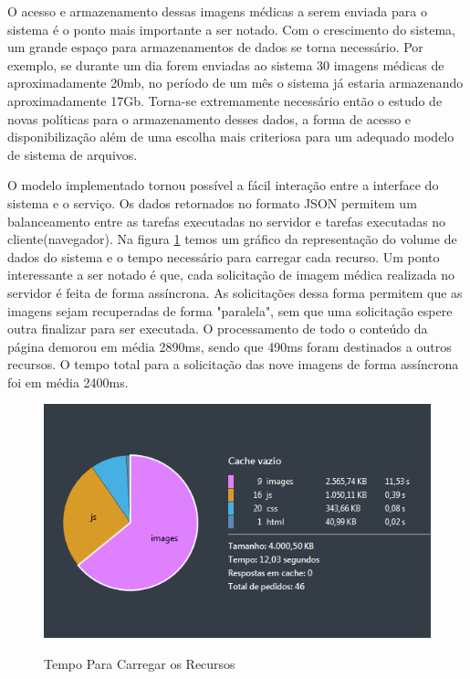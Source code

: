 O acesso e armazenamento dessas imagens médicas a serem enviada para o sistema é o ponto mais importante a ser notado. Com o crescimento do sistema, um grande espaço para armazenamentos de dados se torna necessário. Por exemplo, se durante um dia forem enviadas ao sistema 30 imagens médicas de aproximadamente 20mb, no período de um mês o sistema já estaria armazenando aproximadamente 17Gb. Torna-se extremamente necessário então o estudo de novas políticas para o armazenamento desses dados, a forma de acesso e disponibilização além de uma escolha mais criteriosa para um adequado modelo de sistema de arquivos.

O modelo implementado tornou possível a fácil interação entre a interface do sistema e o serviço. Os dados retornados no formato JSON permitem um balanceamento entre as tarefas executadas no servidor e tarefas executadas no cliente(navegador). Na figura \ref{fig:figura5} temos um gráfico da representação do volume de dados do sistema e o tempo necessário para carregar cada recurso. Um ponto interessante a ser notado é que, cada solicitação de imagem médica realizada no servidor é feita de forma assíncrona. As solicitações dessa forma permitem que as imagens sejam recuperadas de forma "paralela", sem que uma solicitação espere outra finalizar para ser executada. O processamento de todo o conteúdo da página demorou em média 2890ms, sendo que 490ms foram destinados a outros recursos. O tempo total para a solicitação das nove imagens de forma assíncrona foi em média 2400ms.


\begin{figure}[ht]
	\centering	
	\caption[\hspace{0.1cm}Imagens Clínicas.]{Tempo Para Carregar os Recursos}
	\vspace{-0.4cm}
	\includegraphics[width=1.0\textwidth]{figuras/analiseTempoIndividualParaCarregarImagens.png}
	\vspace{-0.2cm}
	\label{fig:figura5}
\end{figure}

